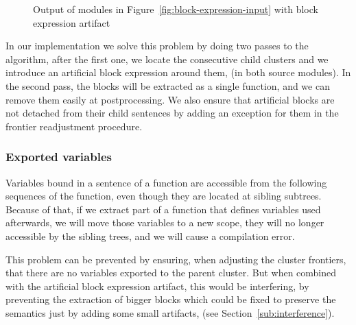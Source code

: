 \begin{figure}
\begin{minipage}[t]{0.5\columnwidth}%
%
\end{minipage}%
\begin{minipage}[t]{0.5\columnwidth}%
%
\end{minipage}

\begin{minipage}[t]{1\columnwidth}%
%
\end{minipage}

\caption{Output of modules in Figure~\ref{fig:block-expression-input} with
block expression artifact\label{fig:block-expression-after}}
\end{figure}


In our implementation we solve this problem by doing two passes to
the algorithm, after the first one, we locate the consecutive child
clusters and we introduce an artificial block expression around them,
(in both source modules). In the second pass, the blocks will be extracted
as a single function, and we can remove them easily at postprocessing.
We also ensure that artificial blocks are not detached from their
child sentences by adding an exception for them in the frontier readjustment
procedure.


\subsubsection{Exported variables}

Variables bound in a sentence of a function are accessible from the
following sequences of the function, even though they are located
at sibling subtrees. Because of that, if we extract part of a function
that defines variables used afterwards, we will move those variables
to a new scope, they will no longer accessible by the sibling trees,
and we will cause a compilation error.

This problem can be prevented by ensuring, when adjusting the cluster
frontiers, that there are no variables exported to the parent cluster.
But when combined with the artificial block expression artifact, this
would be interfering, by preventing the extraction of bigger blocks
which could be fixed to preserve the semantics just by adding some
small artifacts, (see Section~\ref{sub:interference}).


